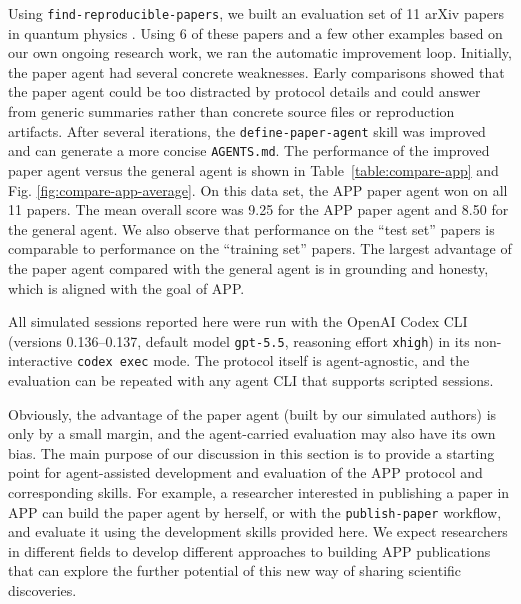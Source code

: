 \documentclass{article}
\begin{document}
Using \texttt{find-reproducible-papers}, we built an evaluation set of 11 arXiv papers in quantum physics \cite{cha2020attention,karakosta2024freespace,perlin2020circuit,barghathi2017particle,perezsalinas2024multiple,liu2022optimal,kumar2026oam,mullerrigat2023certifying,wadhwa2023learning,sokolov2020emergent,malz2020topological}. Using 6 of these papers \cite{cha2020attention,perlin2020circuit,liu2022optimal,kumar2026oam,mullerrigat2023certifying,sokolov2020emergent} and a few other examples based on our own ongoing research work, we ran the automatic improvement loop. Initially, the paper agent had several concrete weaknesses. Early comparisons showed that the paper agent could be too distracted by protocol details and could answer from generic summaries rather than concrete source files or reproduction artifacts. After several iterations, the \texttt{define-paper-agent} skill was improved and can generate a more concise \texttt{AGENTS.md}. The performance of the improved paper agent versus the general agent is shown in Table~\ref{table:compare-app} and Fig. \ref{fig:compare-app-average}. On this data set, the APP paper agent won on all 11 papers. The mean overall score was 9.25 for the APP paper agent and 8.50 for the general agent. We also observe that performance on the ``test set'' papers is comparable to performance on the ``training set'' papers. The largest advantage of the paper agent compared with the general agent is in grounding and honesty, which is aligned with the goal of APP. 

All simulated sessions reported here were run with the OpenAI Codex CLI (versions 0.136--0.137, default model \texttt{gpt-5.5}, reasoning effort \texttt{xhigh}) in its non-interactive \texttt{codex exec} mode. The protocol itself is agent-agnostic, and the evaluation can be repeated with any agent CLI that supports scripted sessions.

Obviously, the advantage of the paper agent (built by our simulated authors) is only by a small margin, and the agent-carried evaluation may also have its own bias. The main purpose of our discussion in this section is to provide a starting point for agent-assisted development and evaluation of the APP protocol and corresponding skills. For example, a researcher interested in publishing a paper in APP can build the paper agent by herself, or with the \texttt{publish-paper} workflow, and evaluate it using the development skills provided here. We expect researchers in different fields to develop different approaches to building APP publications that can explore the further potential of this new way of sharing scientific discoveries.
\end{document}
